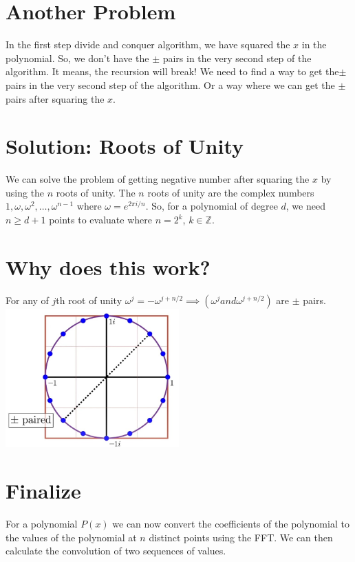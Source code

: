 \documentclass[28]{report}
\begin{document}
\section{Another Problem}
In the first step divide and conquer algorithm, we have squared the $x$ in the polynomial. So, we don't have the $\pm$ pairs in the very second step of the algorithm. It means, the recursion will break! We need to find a way to get the$ \pm $ pairs in the very second step of the algorithm. Or a way where we can get the $\pm $pairs after squaring the \(x\).

\section{Solution: Roots of Unity}
We can solve the problem of getting negative number after squaring the \(x\) by using the \(n\) roots of unity. The \(n\) roots of unity are the complex numbers \(1, \omega, \omega^2, \ldots, \omega^{n-1}\) where \(\omega = e^{2\pi i/n}\). 
So, for a polynomial of degree \(d\), we need \(n \geq d + 1\) points to evaluate where \(n = 2^k\), \(k \in \mathbb{Z}\).


\section{Why does this work?}
For any of $j$th root of unity $\omega^j = - \omega^{j + n/2} \implies (\omega^j and \omega^{j + n/2})$ are $\pm$ pairs.\\


	\includegraphics[width=0.5\textwidth]{images/rootsOfUnity.jpg}
 
\section{Finalize}
For a polynomial $P(x)$ we can now convert the coefficients of the polynomial to the values of the polynomial at \(n\) distinct points using the FFT. We can then calculate the convolution of two sequences of values. 
\end{document}
